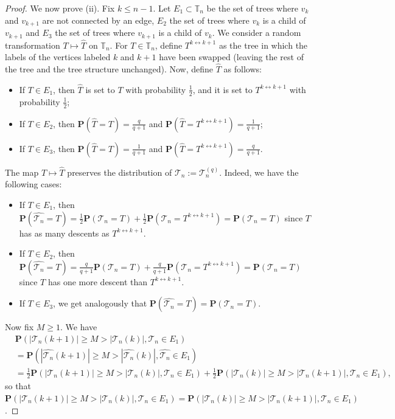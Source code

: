 \documentclass{article}
\theoremstyle{remark}
\newcommand{\bT}{\mathbb{T}}
\newcommand{\abs}[1]{{\left|#1\right|}}
\newcommand{\cT}{\mathcal{T}}
\newcommand{\prob}[1]{\mathbf{P}{\left(#1\right)}}
\begin{document}
\begin{proof}
     We now prove (ii). Fix $k \leq n-1$. 
     Let $E_1 \subset \bT_n$ be the set of trees where $v_k$ and $v_{k+1}$ are not connected by an edge, $E_2$ the set of trees where $v_k$ is a child of $v_{k+1}$ and $E_3$ the set of trees where $v_{k+1}$ is a child of $v_k$.
     We consider a random transformation $T \mapsto \hat{T}$ on $\bT_n$. 
     For $T \in \bT_n$, define $T^{k \leftrightarrow k+1}$ as the tree in which the labels of the vertices labeled $k$ and $k+1$ have been swapped (leaving the rest of the tree and the tree structure unchanged). 
     Now, define $\hat{T}$ as follows:
     \begin{itemize}
         \item If $T \in E_1$, then $\hat{T}$ is set to $T$ with probability $\frac12$, and it is set to $T^{k \leftrightarrow k+1}$ with probability $\frac12$;
         \item If $T \in E_2$, then $\prob{\hat{T}=T}=\frac{q}{q+1}$ and $\prob{\hat{T}=T^{k \leftrightarrow k+1}}=\frac{1}{q+1}$;
         \item If $T \in E_3$, then $\prob{\hat{T}=T}=\frac{1}{q+1}$ and $\prob{\hat{T}=T^{k \leftrightarrow k+1}}=\frac{q}{q+1}$.
     \end{itemize}
     The map $T \mapsto \hat{T}$ preserves the distribution of $\cT_n := \cT_n^{(q)}$. 
     Indeed, we have the following cases:
     \begin{itemize}
         \item If $T \in E_1$, then $\prob{\hat{\cT_n}=T}=\frac{1}{2} \prob{\cT_n=T}+\frac{1}{2} \prob{\cT_n=T^{k \leftrightarrow k+1}} = \prob{\cT_n=T}$ since $T$ has as many descents as $T^{k \leftrightarrow k+1}$.
         \item If $T \in E_2$, then $\prob{\hat{\cT_n}=T}=\frac{q}{q+1} \prob{\cT_n=T}+\frac{q}{q+1} \prob{\cT_n=T^{k \leftrightarrow k+1}} = \prob{\cT_n=T}$ since $T$ has one more descent than $T^{k \leftrightarrow k+1}$.
         \item If $T \in E_3$, we get analogously that $\prob{\hat{\cT_n}=T}=\prob{\cT_n=T}$.
     \end{itemize}
Now fix $M \geq 1$. We have
\begin{align*}
&\prob{\abs{\cT_n(k+1)} \geq M > \abs{\cT_n(k)}, \cT_n \in E_1} 
\\&= \prob{\abs{\hat{\cT_n}(k+1)} \geq M > \abs{\hat{\cT_n}(k)}, \hat{\cT_n} \in E_1}\\
&= \frac12 \prob{\abs{\cT_n(k+1)} \geq M > \abs{\cT_n(k)}, \cT_n \in E_1} + \frac12 \prob{\abs{\cT_n(k)} \geq M > \abs{\cT_n(k+1)}, \cT_n \in E_1},
\end{align*}
so that $\prob{\abs{\cT_n(k+1)} \geq M > \abs{\cT_n(k)}, \cT_n \in E_1}=\prob{\abs{\cT_n(k)} \geq M > \abs{\cT_n(k+1)}, \cT_n \in E_1}$.


\end{proof}
\end{document}
